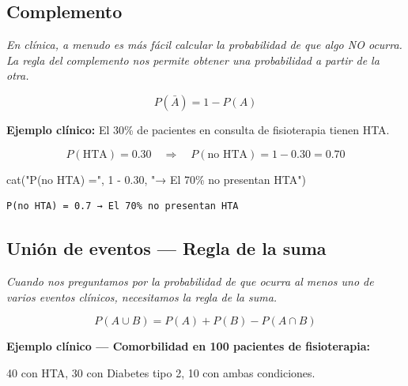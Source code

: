 \documentclass[
  letterpaper,
  DIV=11,
  numbers=noendperiod]{scrartcl}
\newenvironment{Shaded}{\begin{snugshade}}{\end{snugshade}}
\newcommand{\DecValTok}[1]{\textcolor[rgb]{0.68,0.00,0.00}{#1}}
\newcommand{\FloatTok}[1]{\textcolor[rgb]{0.68,0.00,0.00}{#1}}
\newcommand{\FunctionTok}[1]{\textcolor[rgb]{0.28,0.35,0.67}{#1}}
\newcommand{\NormalTok}[1]{\textcolor[rgb]{0.00,0.23,0.31}{#1}}
\newcommand{\SpecialCharTok}[1]{\textcolor[rgb]{0.37,0.37,0.37}{#1}}
\newcommand{\StringTok}[1]{\textcolor[rgb]{0.13,0.47,0.30}{#1}}
\begin{document}
\subsection{Complemento}\label{complemento}

\emph{En clínica, a menudo es más fácil calcular la probabilidad de que
algo NO ocurra. La regla del complemento nos permite obtener una
probabilidad a partir de la otra.}

\[P(\bar{A}) = 1 - P(A)\]

\textbf{Ejemplo clínico:} El 30\% de pacientes en consulta de
fisioterapia tienen HTA.

\[P(\text{HTA}) = 0.30 \quad \Rightarrow \quad P(\text{no HTA}) = 1 - 0.30 = 0.70\]

\begin{Shaded}
\begin{Highlighting}[]
\FunctionTok{cat}\NormalTok{(}\StringTok{"P(no HTA) ="}\NormalTok{, }\DecValTok{1} \SpecialCharTok{{-}} \FloatTok{0.30}\NormalTok{, }\StringTok{"→ El 70\% no presentan HTA"}\NormalTok{)}
\end{Highlighting}
\end{Shaded}

\begin{verbatim}
P(no HTA) = 0.7 → El 70% no presentan HTA
\end{verbatim}

\subsection{Unión de eventos --- Regla de la
suma}\label{union-de-eventos-regla-de-la-suma}

\emph{Cuando nos preguntamos por la probabilidad de que ocurra al menos
uno de varios eventos clínicos, necesitamos la regla de la suma.}

\[P(A \cup B) = P(A) + P(B) - P(A \cap B)\]

\textbf{Ejemplo clínico --- Comorbilidad en 100 pacientes de
fisioterapia:}

40 con HTA, 30 con Diabetes tipo 2, 10 con ambas condiciones.
\end{document}
